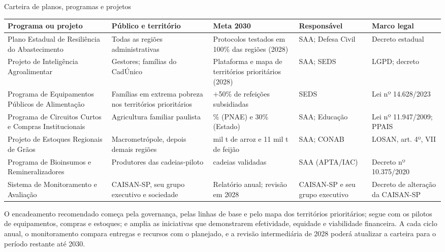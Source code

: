\documentclass[
	12pt,				%
	openright,			%
	oneside,			%
	a4paper,			%
	chapter=TITLE,		%
	section=TITLE,		%
	english,			%
	french,				%
	spanish,			%
	brazil,				%
 ]{abntex2}
\begin{document}
\begin{quadro}[!htbp]
\centering
\caption{Carteira de planos, programas e projetos}
\label{qua:planos-programas-projetos}
\footnotesize
\renewcommand{\arraystretch}{1.05}
\setlength{\tabcolsep}{2.5pt}
\begin{tabularx}{\textwidth}{|>{\raggedright\arraybackslash}p{2.7cm}|>{\raggedright\arraybackslash}p{2.5cm}|>{\raggedright\arraybackslash}X|>{\raggedright\arraybackslash}p{2.1cm}|>{\raggedright\arraybackslash}p{2.3cm}|}
\hline
\textbf{Programa ou projeto} & \textbf{Público e território} & \textbf{Meta 2030} & \textbf{Responsável} & \textbf{Marco legal} \\
\hline
Plano Estadual de Resiliência do Abastecimento & Todas as regiões administrativas & Protocolos testados em 100\% das regiões (2028) & SAA; Defesa Civil & Decreto estadual \\
\hline
Projeto de Inteligência Agroalimentar & Gestores; famílias do CadÚnico & Plataforma e mapa de territórios prioritários (2028) & SAA; SEDS & LGPD; decreto \\
\hline
Programa de Equipamentos Públicos de Alimentação & Famílias em extrema pobreza nos territórios prioritários & $+$50\% de refeições subsidiadas & SEDS & Lei nº 14.628/2023 \\
\hline
Programa de Circuitos Curtos e Compras Institucionais & Agricultura familiar paulista & 45\% (PNAE) e 30\% (Estado) & SAA; Educação & Lei nº 11.947/2009; PPAIS \\
\hline
Projeto de Estoques Regionais de Grãos & Macrometrópole, depois demais regiões & 29 mil t de arroz e 11 mil t de feijão & SAA; CONAB & LOSAN, art. 4º, VII \\
\hline
Programa de Bioinsumos e Remineralizadores & Produtores das cadeias-piloto & 3 cadeias validadas & SAA (APTA/IAC) & Decreto nº 10.375/2020 \\
\hline
Sistema de Monitoramento e Avaliação & CAISAN-SP, seu grupo executivo e sociedade & Relatório anual; revisão em 2028 & CAISAN-SP e seu grupo executivo & Decreto de alteração da CAISAN-SP \\
\hline
\end{tabularx}
\end{quadro}

O encadeamento recomendado começa pela governança, pelas linhas de base e pelo
mapa dos territórios prioritários; segue com os pilotos de equipamentos, compras
e estoques; e amplia as iniciativas que demonstrarem efetividade, equidade e
viabilidade financeira. A cada ciclo anual, o monitoramento compara entregas e
recursos com o planejado, e a revisão intermediária de 2028 poderá atualizar a
carteira para o período restante até 2030.
\end{document}
